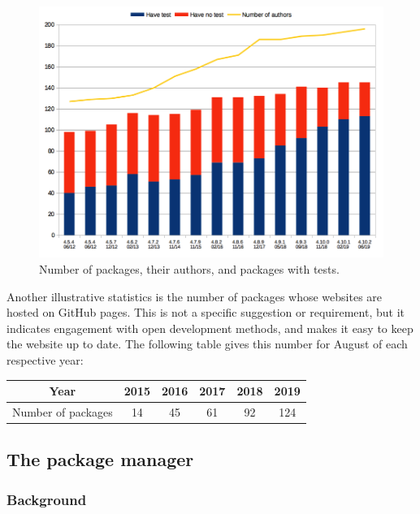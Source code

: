 \begin{figure}[!ht]
    \centering
    \includegraphics[width=\textwidth]{images/gap-package-tests}
    \caption{Number of \GAP packages, their authors, and packages with tests.}
    \label{fig:gap-package-tests}
\end{figure}

Another illustrative statistics is the number of \GAP packages
whose websites are hosted on GitHub pages. This is not a
specific suggestion or requirement, but it indicates engagement with
open development  methods, and makes it easy to keep the website up to date.
The following table gives this number for August of each respective year:

\begin{center}
\begin{tabular}{| c | c | c | c | c | c |} 
\hline
Year & 2015 & 2016 & 2017 & 2018 & 2019 \\
\hline
Number of packages & 14 & 45 & 61 & 92 & 124 \\
\hline
\end{tabular}
\end{center}

\subsection{The \GAP package manager}\label{pkg-manager}

\subsubsection{Background}

